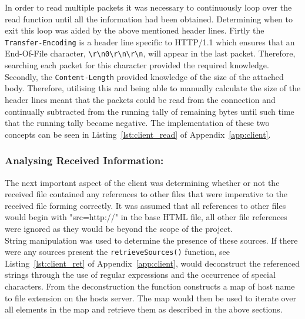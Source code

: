 \documentclass[10pt,twocolumn]{witseiepaper}
\begin{document}
		In order to read multiple packets it was necessary to continuously loop over the read function until all the information had been obtained. Determining when to exit this loop was aided by the above mentioned header lines. Firtly the \texttt{Transfer-Encoding} is a header line specific to HTTP/1.1 which ensures that an End-Of-File character, \texttt{\textbackslash r\textbackslash n0\textbackslash r\textbackslash n\textbackslash r\textbackslash n}, will appear in the last packet. Therefore, searching each packet for this character provided the required knowledge. Secondly, the \texttt{Content-Length} provided knowledge of the size of the attached body. Therefore, utilising this and being able to manually calculate the size of the header lines meant that the packets could be read from the connection and continually subtracted from the running tally of remaining bytes until such time that the running tally became negative. The implementation of these two concepts can be seen in Listing~\ref{lst:client_read} of Appendix~\ref{app:client}. 
		
		\subsubsection*{Analysing Received Information:} The next important aspect of the client was determining whether or not the received file contained any references to other files that were imperative to the received file forming correctly. It was assumed that all references to other files would begin with "src=http://" in the base HTML file, all other file references were ignored as they would be beyond the scope of the project.\\
		
		String manipulation was used to determine the presence of these sources. If there were any sources present the \texttt{retrieveSources()} function, see Listing~\ref{lst:client_ret} of Appendix~\ref{app:client}, would deconstruct the referenced strings through the use of regular expressions and the occurrence of special characters. From the deconstruction the function constructs a map of host name to file extension on the hosts server. The map would then be used to iterate over all elements in the map and retrieve them as described in the above sections.
				
			
	
% 

\end{document}
